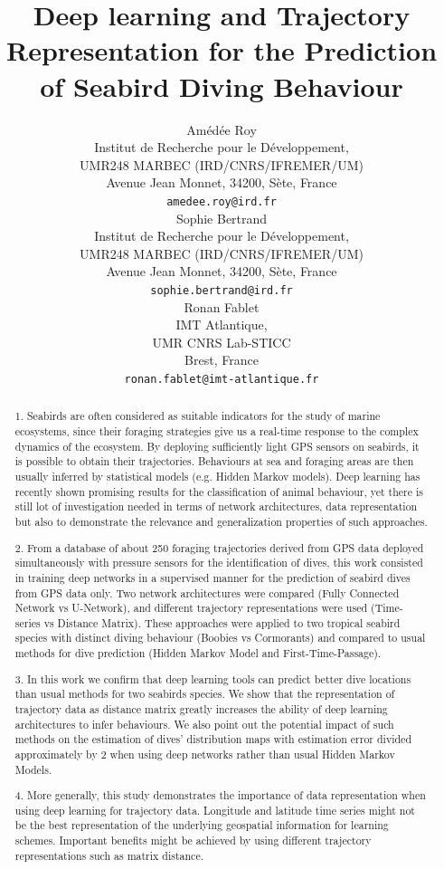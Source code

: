 \documentclass{article}
\title{Deep learning and Trajectory Representation for the Prediction of Seabird Diving Behaviour}
\author{
  Amédée Roy \\
  Institut de Recherche pour le Développement,\\
  UMR248 MARBEC (IRD/CNRS/IFREMER/UM)\\
  Avenue Jean Monnet, 34200, Sète, France \\
  \texttt{amedee.roy@ird.fr} \\
   \And
  Sophie Bertrand \\
  Institut de Recherche pour le Développement,\\
  UMR248 MARBEC (IRD/CNRS/IFREMER/UM)\\
  Avenue Jean Monnet, 34200, Sète, France \\
  \texttt{sophie.bertrand@ird.fr} \\
  \And
  Ronan Fablet \\
  IMT Atlantique,\\
  UMR CNRS Lab-STICC\\
  Brest, France \\
  \texttt{ronan.fablet@imt-atlantique.fr} \\
}
\begin{document}
\maketitle
\linenumbers
\doublespacing


\begin{abstract}

1. Seabirds are often considered as suitable indicators for the study of marine ecosystems, since their foraging strategies give us a real-time response to the complex dynamics of the ecosystem. By deploying sufficiently light GPS sensors on seabirds, it is  possible to obtain their trajectories. Behaviours at sea and foraging areas are then usually inferred by statistical models (e.g. Hidden Markov models). Deep learning has recently shown promising results for the classification of animal behaviour, yet there is still lot of investigation needed in terms of network architectures, data representation but also to demonstrate the relevance and generalization properties of such approaches.

2. From a database of about 250 foraging trajectories derived from GPS data deployed simultaneously with pressure sensors for the identification of dives, this work consisted in training deep networks in a supervised manner for the prediction of seabird dives from GPS data only. Two network architectures were compared (Fully Connected Network vs U-Network), and different trajectory representations were used (Time-series vs Distance Matrix). These approaches were applied to two tropical seabird species with distinct diving behaviour (Boobies vs Cormorants) and compared to usual methods for dive prediction (Hidden Markov Model and First-Time-Passage).

3. In this work we confirm that deep learning tools can predict better dive locations than  usual methods for two seabirds species. We show that the representation of trajectory data as distance matrix  greatly increases the ability of deep learning architectures to infer behaviours. We also point out the potential impact of such methods on the estimation of dives' distribution maps with estimation error divided approximately by 2 when using deep networks rather than usual Hidden Markov Models.

4. More generally, this study demonstrates the importance of data representation when using deep learning for trajectory data. Longitude and latitude time series might not be the best representation of the underlying geospatial information for learning schemes. Important benefits might be achieved by using different trajectory representations such as matrix distance.

\end{abstract}
\end{document}
